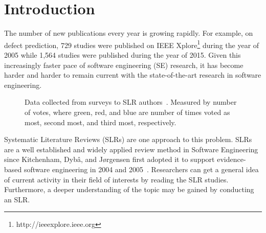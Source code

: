 \documentclass{svjour3}
\theoremstyle{break}
\begin{document}
\section{Introduction}
\label{sect: Introduction}

The number of new publications every year is growing rapidly. For example, on defect
prediction, 729 studies were published on IEEE
Xplore\footnote{http://ieeexplore.ieee.org} during the year of 2005 while 1,564
studies were published during the year of 2015.
Given this increasingly faster pace of software engineering (SE) research,
it has become harder and harder to remain current with
the state-of-the-art research in software engineering.


\begin{figure}[t]
    \centering
    \caption{Data collected from surveys to SLR authors~\cite{carver2013identifying}. Measured by number of votes, where {\setlength{\fboxsep}{1pt}\colorbox{green!40}{green}}, {\setlength{\fboxsep}{1pt}\colorbox{red!30}{red}}, and {\setlength{\fboxsep}{1pt}\colorbox{blue!50}{blue}} are number of times voted as most, second most, and third most, respectively.}
    \label{fig:barrier}
\end{figure}
Systematic Literature Reviews
(SLRs) are one approach to this problem. SLRs are a well established and widely
applied review method in Software Engineering since Kitchenham, Dyb{\^{a}}, and
J{\o}rgensen first adopted it to support evidence-based software engineering in
2004 and 2005~\cite{kitchenham2004evidence,1377125}. 
Researchers can get a
general idea of current activity in their field of interests by reading the SLR
studies. Furthermore, a
deeper understanding of the topic may be gained by conducting an SLR.
\end{document}
